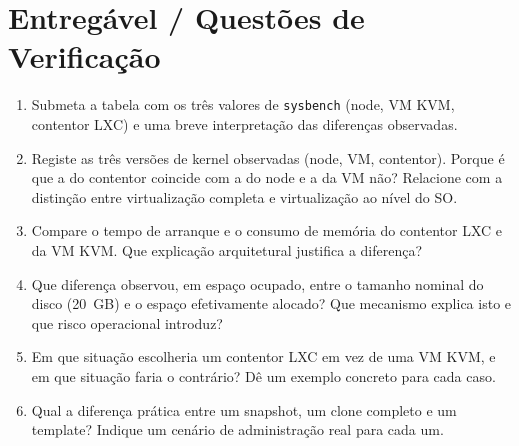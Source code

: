 \documentclass[11pt,a4paper]{article}
\begin{document}
\section{Entregável / Questões de Verificação}
\begin{enumerate}[label=\alph*)]
  \setlength\itemsep{0.2cm}
  \item Submeta a tabela com os três valores de \texttt{sysbench} (node, VM KVM, contentor LXC) e uma breve interpretação das diferenças observadas.
  \item Registe as três versões de kernel observadas (node, VM, contentor). Porque é que a do contentor coincide com a do node e a da VM não? Relacione com a distinção entre virtualização completa e virtualização ao nível do SO.
  \item Compare o tempo de arranque e o consumo de memória do contentor LXC e da VM KVM. Que explicação arquitetural justifica a diferença?
  \item Que diferença observou, em espaço ocupado, entre o tamanho nominal do disco (20~GB) e o espaço efetivamente alocado? Que mecanismo explica isto e que risco operacional introduz?
  \item Em que situação escolheria um contentor LXC em vez de uma VM KVM, e em que situação faria o contrário? Dê um exemplo concreto para cada caso.
  \item Qual a diferença prática entre um snapshot, um clone completo e um template? Indique um cenário de administração real para cada um.
\end{enumerate}
\end{document}

